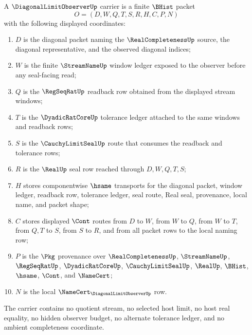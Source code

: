 \begin{definition}
\label{def:diagonal-limit-observer-carrier}
A $\DiagonalLimitObserverUp$ carrier is a finite $\BHist$ packet
$$
O=(D,W,Q,T,S,R,H,C,P,N)
$$
with the following displayed coordinates:
\begin{enumerate}
\item $D$ is the diagonal packet naming the $\RealCompletenessUp$ source, the diagonal representative, and the observed diagonal indices;
\item $W$ is the finite $\StreamNameUp$ window ledger exposed to the observer before any seal-facing read;
\item $Q$ is the $\RegSeqRatUp$ readback row obtained from the displayed stream windows;
\item $T$ is the $\DyadicRatCoreUp$ tolerance ledger attached to the same windows and readback rows;
\item $S$ is the $\CauchyLimitSealUp$ route that consumes the readback and tolerance rows;
\item $R$ is the $\RealUp$ seal row reached through $D,W,Q,T,S$;
\item $H$ stores componentwise $\hsame$ transports for the diagonal packet, window ledger, readback row, tolerance ledger, seal route, Real seal, provenance, local name, and packet shape;
\item $C$ stores displayed $\Cont$ routes from $D$ to $W$, from $W$ to $Q$, from $W$ to $T$, from $Q,T$ to $S$, from $S$ to $R$, and from all packet rows to the local naming row;
\item $P$ is the $\Pkg$ provenance over $\RealCompletenessUp$, $\StreamNameUp$, $\RegSeqRatUp$, $\DyadicRatCoreUp$, $\CauchyLimitSealUp$, $\RealUp$, $\BHist$, $\hsame$, $\Cont$, and $\NameCert$;
\item $N$ is the local $\NameCert_{\DiagonalLimitObserverUp}$ row.
\end{enumerate}
The carrier contains no quotient stream, no selected host limit, no host real equality, no hidden observer budget, no alternate tolerance ledger, and no ambient completeness coordinate.
\end{definition}

